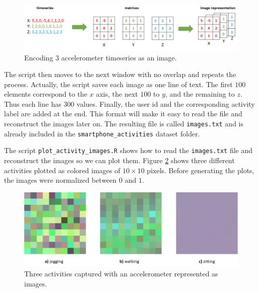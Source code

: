 \documentclass[
  11pt,
]{krantz}
\begin{document}
\begin{figure}

{\centering \includegraphics[width=0.9\linewidth]{images/series_to_image} 

}

\caption{Encoding 3 accelerometer timeseries as an image.}\label{fig:seriesToImage}
\end{figure}

The script then moves to the next window with no overlap and repeats the process. Actually, the script saves each image as one line of text. The first \(100\) elements correspond to the \(x\) axis, the next \(100\) to \(y\), and the remaining to \(z\). Thus each line has \(300\) values. Finally, the user id and the corresponding activity label are added at the end. This format will make it easy to read the file and reconstruct the images later on. The resulting file is called \texttt{images.txt} and is already included in the \texttt{smartphone\_activities} dataset folder.

The script \texttt{plot\_activity\_images.R} shows how to read the \texttt{images.txt} file and reconstruct the images so we can plot them. Figure \ref{fig:activitiesImages} shows three different activities plotted as colored images of \(10 \times 10\) pixels. Before generating the plots, the images were normalized between \(0\) and \(1\).

\begin{figure}

{\centering \includegraphics[width=0.9\linewidth]{images/activities_images} 

}

\caption{Three activities captured with an accelerometer represented as images.}\label{fig:activitiesImages}
\end{figure}
\end{document}
